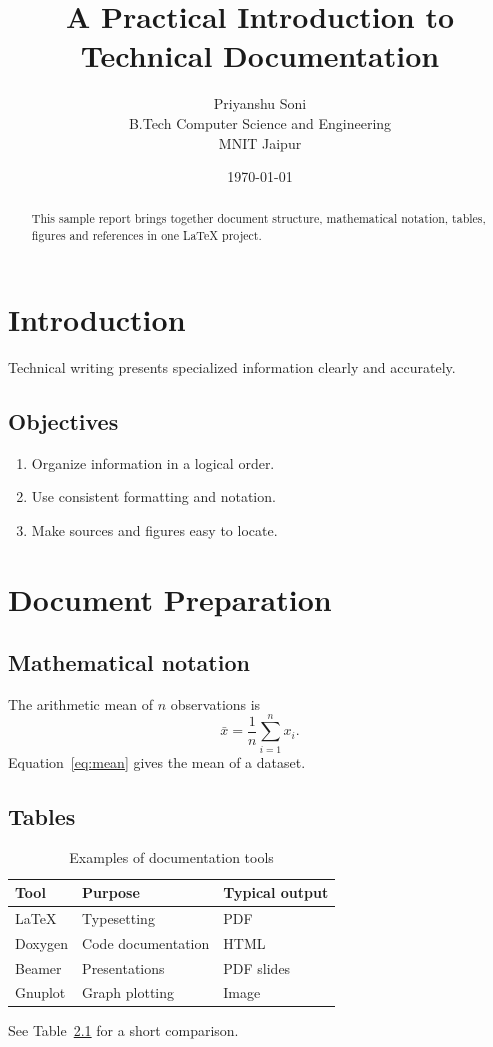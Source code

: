 \documentclass[12pt,a4paper]{report}
\title{A Practical Introduction to Technical Documentation}
\author{Priyanshu Soni\\B.Tech Computer Science and Engineering\\MNIT Jaipur}
\date{\today}
\begin{document}
\maketitle
{}
\begin{abstract}
This sample report brings together document structure, mathematical notation,
tables, figures and references in one LaTeX project.
\end{abstract}
\tableofcontents
\listoftables
\listoffigures
\clearpage
{}
\chapter{Introduction}
Technical writing presents specialized information clearly and accurately.
\section{Objectives}
\begin{enumerate}
\item Organize information in a logical order.
\item Use consistent formatting and notation.
\item Make sources and figures easy to locate.
\end{enumerate}
\chapter{Document Preparation}
\section{Mathematical notation}
The arithmetic mean of \(n\) observations is
\begin{equation}
\bar{x}=\frac{1}{n}\sum_{i=1}^{n}x_i.
\label{eq:mean}
\end{equation}
Equation~\ref{eq:mean} gives the mean of a dataset.
\section{Tables}
\begin{table}[ht]
\centering
\caption{Examples of documentation tools}
\label{tab:tools}
\begin{tabular}{lll}
\toprule
Tool & Purpose & Typical output \\
\midrule
LaTeX & Typesetting & PDF \\
Doxygen & Code documentation & HTML \\
Beamer & Presentations & PDF slides \\
Gnuplot & Graph plotting & Image \\
\bottomrule
\end{tabular}
\end{table}
See Table~\ref{tab:tools} for a short comparison.
\end{document}
